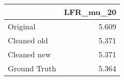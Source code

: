 \begin{tabular}{lr}
\toprule
{} & LFR_mu_20 \\
\midrule
Original     &     5.609 \\
Cleaned old  &     5.371 \\
Cleaned new  &     5.371 \\
Ground Truth &     5.364 \\
\bottomrule
\end{tabular}
